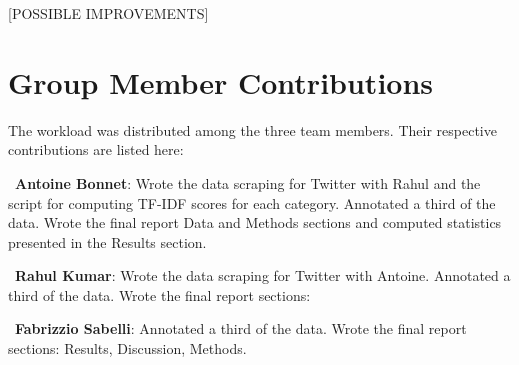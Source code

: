 \documentclass[letterpaper]{article} %
\begin{document}
[POSSIBLE IMPROVEMENTS]


\section{Group Member Contributions}

The workload was distributed among the three team members. Their respective contributions are listed here: 

\  \textbf{Antoine Bonnet}: Wrote the data scraping for Twitter with Rahul and the script for computing TF-IDF scores for each category. Annotated a third of the data. Wrote the final report Data and Methods sections and computed statistics presented in the Results section.

\  \textbf{Rahul Kumar}: Wrote the data scraping for Twitter with Antoine. Annotated a third of the data. Wrote the final report sections:  

\  \textbf{Fabrizzio Sabelli}: Annotated a third of the data. Wrote the final report sections: Results, Discussion, Methods.
  
  
{}
\end{document}
